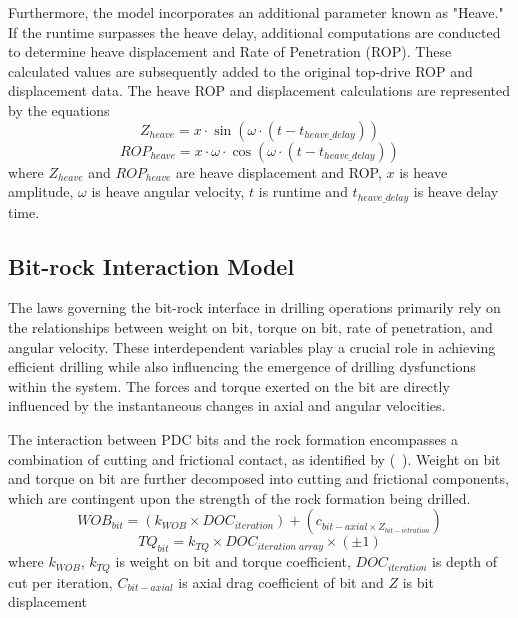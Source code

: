 Furthermore, the model incorporates an additional parameter known as "Heave." If the runtime surpasses the heave delay, additional computations are conducted to determine heave displacement and Rate of Penetration (ROP). These calculated values are subsequently added to the original top-drive ROP and displacement data. The heave ROP and displacement calculations are represented by the equations
\begin{equation}\label{Z_heave}
  Z_{heave} = x \cdot \sin(\omega \cdot (t - t_{heave\_delay}))
\end{equation}
\begin{equation}\label{ROP_heave}
  ROP_{heave} = x \cdot \omega \cdot \cos(\omega \cdot (t - t_{heave\_delay}))
\end{equation}
where 
$Z_{heave}$ and $ROP_{heave}$ are heave displacement and ROP, $x$ is heave amplitude, $\omega$ is heave angular velocity, $t$ is runtime and $t_{heave\_delay}$ is heave delay time.
 
\subsection{Bit-rock Interaction Model}

The laws governing the bit-rock interface in drilling operations primarily rely on the relationships between weight on bit, torque on bit, rate of penetration, and angular velocity. These interdependent variables play a crucial role in achieving efficient drilling while also influencing the emergence of drilling dysfunctions within the system. The forces and torque exerted on the bit are directly influenced by the instantaneous changes in axial and angular velocities.

The interaction between PDC bits and the rock formation encompasses a combination of cutting and frictional contact, as identified by (~\cite{ref:detournay1992a}). Weight on bit and torque on bit are further decomposed into cutting and frictional components, which are contingent upon the strength of the rock formation being drilled.
\begin{equation}\label{WOB}
  WOB_{bit} = (k_{WOB}\times DOC_{iteration}) + (c_{bit-axial\times \dot{Z}_{bit-ietration}})
\end{equation}
\begin{equation}\label{Torque}
  TQ_{bit} = k_{TQ}\times DOC_{iteration\; array}\times (\pm1)
\end{equation}
where $k_{WOB}$, $k_{TQ}$ is weight on bit and torque coefficient, $DOC_{iteration}$ is depth of cut per iteration, $C_{bit-axial}$ is axial drag coefficient of bit and $Z$ is bit displacement 

